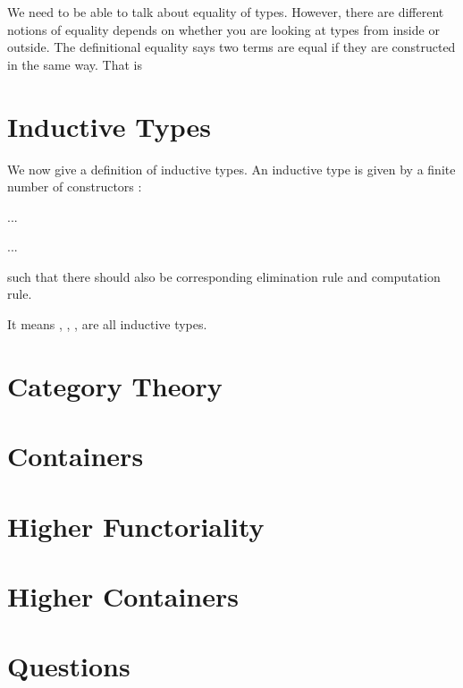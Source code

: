 We need to be able to talk about equality of types. However, there are different notions of equality depends on whether you are looking at types from inside or outside. The definitional equality says two terms are equal if they are constructed in the same way. That is 

\section{Inductive Types}

We now give a definition of inductive types. An inductive type  is given by a finite number of constructors :

\AgdaSpace{}%
\AgdaSpace{}%
\AgdaSymbol{:}\AgdaSpace{}%
\AgdaSpace{}%
%

%
%
\AgdaSymbol{:}\AgdaSpace{}%
\AgdaSpace{}%
\AgdaSpace{}%
\AgdaSpace{}%
\AgdaSpace{}%
...
\AgdaSpace{}%
%

%
%
\AgdaSymbol{:}\AgdaSpace{}%
\AgdaSpace{}%
\AgdaSpace{}%
\AgdaSpace{}%
\AgdaSpace{}%
...
\AgdaSpace{}%
%

such that there should also be corresponding elimination rule and computation rule.

It means , , ,  are all inductive types.

\section{Category Theory}

\section{Containers}

\section{Higher Functoriality}

\section{Higher Containers}

\section{Questions}
